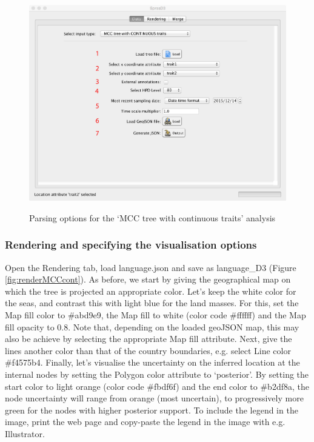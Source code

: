 \documentclass[english]{paper}
\begin{document}
\begin{figure}[!H]
\centering
\includegraphics[width=1\textwidth]{./figures/Fig3_parse.pdf} %
\label{fig:parseMCCcont}
\caption{Parsing options for the `MCC tree with continuous traits' analysis}
\end{figure}

\subsubsection{Rendering and specifying the visualisation options}

Open the Rendering tab, load language.json and save as language\_D3 (Figure \ref{fig:renderMCCcont}).
As before, we start by giving the geographical map on which the tree is projected an appropriate color. 
Let's keep the white color for the seas, and contrast this with light blue for the land masses. %
For this, set the Map fill color to \#abd9e9, the Map fill to white (color code \#ffffff) and the Map fill opacity to 0.8. 
Note that, depending on the loaded geoJSON map, this may also be achieve by selecting the appropriate Map fill attribute. 
Next, give the lines another color than that of the country boundaries, e.g. select Line color \#f4575b4.
Finally, let's visualise the uncertainty on the inferred location at the internal nodes by setting the Polygon color attribute to `posterior'.
By setting the start color to light orange (color code \#fbdf6f) and the end color to \#b2df8a, the node uncertainty will range from orange (most uncertain), to progressively more green for the nodes with higher posterior support.
To include the legend in the image, print the web page and copy-paste the legend in the image with e.g. Illustrator. 
\end{document}
